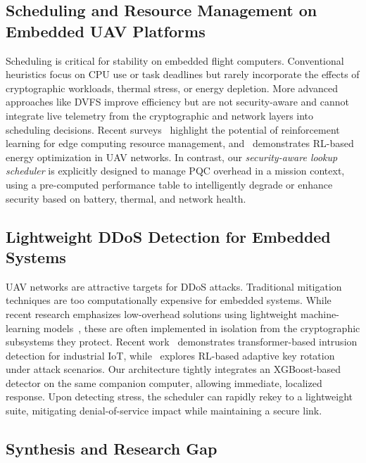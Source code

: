 \documentclass[sigconf,natbib=false]{acmart}
\begin{document}
\subsection{Scheduling and Resource Management on Embedded UAV Platforms}

Scheduling is critical for stability on embedded flight computers. Conventional heuristics focus on CPU use or task deadlines but rarely incorporate the effects of cryptographic workloads, thermal stress, or energy depletion. More advanced approaches like DVFS improve efficiency but are not security-aware and cannot integrate live telemetry from the cryptographic and network layers into scheduling decisions. Recent surveys~\cite{hortelano_rl_edge_survey_2023,zhou_drl_resource_edge_2024} highlight the potential of reinforcement learning for edge computing resource management, and~\cite{uav_rl_energy_2023} demonstrates RL-based energy optimization in UAV networks. In contrast, our \textit{security-aware lookup scheduler} is explicitly designed to manage PQC overhead in a mission context, using a pre-computed performance table to intelligently degrade or enhance security based on battery, thermal, and network health.

\subsection{Lightweight DDoS Detection for Embedded Systems}

UAV networks are attractive targets for DDoS attacks. Traditional mitigation techniques are too computationally expensive for embedded systems. While recent research emphasizes low-overhead solutions using lightweight machine-learning models~\cite{xgboost_2016,zerveas_tst_2021}, these are often implemented in isolation from the cryptographic subsystems they protect. Recent work~\cite{futureinternet_transformer_iiot_2025} demonstrates transformer-based intrusion detection for industrial IoT, while~\cite{fang_rl_key_rotation_zigbee_2024} explores RL-based adaptive key rotation under attack scenarios. Our architecture tightly integrates an XGBoost-based detector on the same companion computer, allowing immediate, localized response. Upon detecting stress, the scheduler can rapidly rekey to a lightweight suite, mitigating denial-of-service impact while maintaining a secure link.

\subsection{Synthesis and Research Gap}
\end{document}
